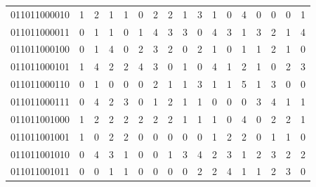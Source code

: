 \documentclass[10pt,a4paper]{article}
\begin{document}
\begin{longtable}{ |c|c|c|c|c|c|c|c|c|c|c|c|c|c|c|c|c| }
    011011000010              & 1                            & 2                                & 1                            & 1                              & 0   & 2   & 2   & 1   & 3   & 1   & 0   & 4   & 0   & 0   & 0   & 1   \\
    011011000011              & 0                            & 1                                & 1                            & 0                              & 1   & 4   & 3   & 3   & 0   & 4   & 3   & 1   & 3   & 2   & 1   & 4   \\
    011011000100              & 0                            & 1                                & 4                            & 0                              & 2   & 3   & 2   & 0   & 2   & 1   & 0   & 1   & 1   & 2   & 1   & 0   \\
    011011000101              & 1                            & 4                                & 2                            & 2                              & 4   & 3   & 0   & 1   & 0   & 4   & 1   & 2   & 1   & 0   & 2   & 3   \\
    011011000110              & 0                            & 1                                & 0                            & 0                              & 0   & 2   & 1   & 1   & 3   & 1   & 1   & 5   & 1   & 3   & 0   & 0   \\
    011011000111              & 0                            & 4                                & 2                            & 3                              & 0   & 1   & 2   & 1   & 1   & 0   & 0   & 0   & 3   & 4   & 1   & 1   \\
    011011001000              & 1                            & 2                                & 2                            & 2                              & 2   & 2   & 2   & 1   & 1   & 1   & 0   & 4   & 0   & 2   & 2   & 1   \\
    011011001001              & 1                            & 0                                & 2                            & 2                              & 0   & 0   & 0   & 0   & 0   & 1   & 2   & 2   & 0   & 1   & 1   & 0   \\
    011011001010              & 0                            & 4                                & 3                            & 1                              & 0   & 0   & 1   & 3   & 4   & 2   & 3   & 1   & 2   & 3   & 2   & 2   \\
    011011001011              & 0                            & 0                                & 1                            & 1                              & 0   & 0   & 0   & 0   & 2   & 2   & 4   & 1   & 1   & 2   & 3   & 0   \\

\end{longtable}
\end{document}

